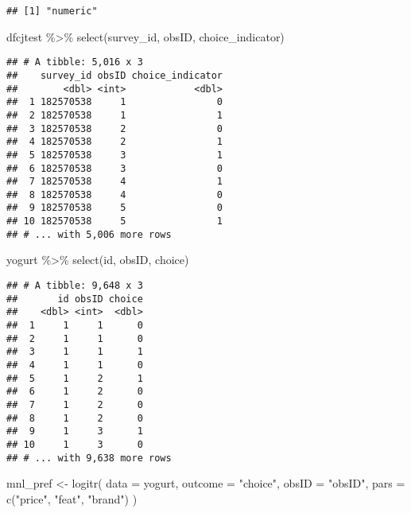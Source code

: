 \documentclass[
]{article}
\newenvironment{Shaded}{\begin{snugshade}}{\end{snugshade}}
\newcommand{\AttributeTok}[1]{\textcolor[rgb]{0.77,0.63,0.00}{#1}}
\newcommand{\FunctionTok}[1]{\textcolor[rgb]{0.00,0.00,0.00}{#1}}
\newcommand{\NormalTok}[1]{#1}
\newcommand{\OtherTok}[1]{\textcolor[rgb]{0.56,0.35,0.01}{#1}}
\newcommand{\SpecialCharTok}[1]{\textcolor[rgb]{0.00,0.00,0.00}{#1}}
\newcommand{\StringTok}[1]{\textcolor[rgb]{0.31,0.60,0.02}{#1}}
\begin{document}
\begin{verbatim}
## [1] "numeric"
\end{verbatim}

\begin{Shaded}
\begin{Highlighting}[]
\NormalTok{dfcjtest }\SpecialCharTok{\%\textgreater{}\%} 
  \FunctionTok{select}\NormalTok{(survey\_id, obsID, choice\_indicator)}
\end{Highlighting}
\end{Shaded}

\begin{verbatim}
## # A tibble: 5,016 x 3
##    survey_id obsID choice_indicator
##        <dbl> <int>            <dbl>
##  1 182570538     1                0
##  2 182570538     1                1
##  3 182570538     2                0
##  4 182570538     2                1
##  5 182570538     3                1
##  6 182570538     3                0
##  7 182570538     4                1
##  8 182570538     4                0
##  9 182570538     5                0
## 10 182570538     5                1
## # ... with 5,006 more rows
\end{verbatim}

\begin{Shaded}
\begin{Highlighting}[]
\NormalTok{yogurt }\SpecialCharTok{\%\textgreater{}\%} 
  \FunctionTok{select}\NormalTok{(id, obsID, choice)}
\end{Highlighting}
\end{Shaded}

\begin{verbatim}
## # A tibble: 9,648 x 3
##       id obsID choice
##    <dbl> <int>  <dbl>
##  1     1     1      0
##  2     1     1      0
##  3     1     1      1
##  4     1     1      0
##  5     1     2      1
##  6     1     2      0
##  7     1     2      0
##  8     1     2      0
##  9     1     3      1
## 10     1     3      0
## # ... with 9,638 more rows
\end{verbatim}

\begin{Shaded}
\begin{Highlighting}[]
\NormalTok{mnl\_pref }\OtherTok{\textless{}{-}} \FunctionTok{logitr}\NormalTok{(}
    \AttributeTok{data    =}\NormalTok{ yogurt,}
    \AttributeTok{outcome =} \StringTok{"choice"}\NormalTok{,}
    \AttributeTok{obsID   =} \StringTok{"obsID"}\NormalTok{,}
    \AttributeTok{pars    =} \FunctionTok{c}\NormalTok{(}\StringTok{"price"}\NormalTok{, }\StringTok{"feat"}\NormalTok{, }\StringTok{"brand"}\NormalTok{)}
\NormalTok{)}
\end{Highlighting}
\end{Shaded}
\end{document}
